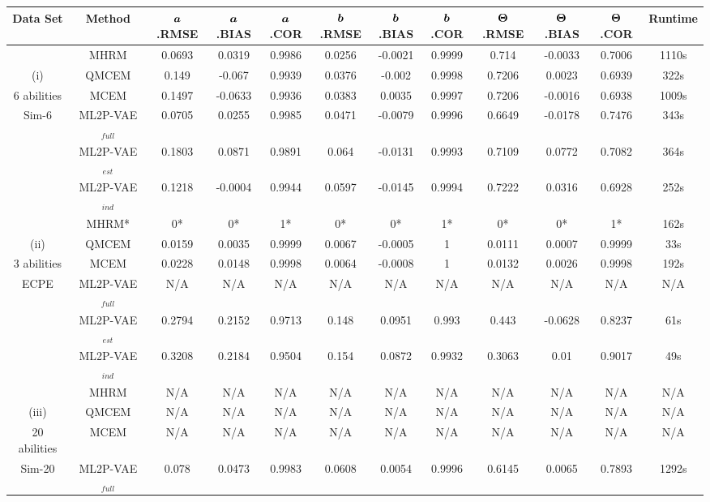 \begin{table}
\footnotesize{
\centering
\begin{tabular}{c|c|ccc|ccc|ccc|c}
  \hline
    Data Set & Method & $\boldsymbol{a}$.RMSE & $\boldsymbol{a}$.BIAS & $\boldsymbol{a}$.COR & $\boldsymbol{b}$.RMSE & $\boldsymbol{b}$.BIAS & $\boldsymbol{b}$.COR &  $\boldsymbol{\Theta}$.RMSE & $\boldsymbol{\Theta}$.BIAS & $\boldsymbol{\Theta}$.COR & Runtime \\
    \hline
& MHRM & 0.0693 & 0.0319  & 0.9986   & 0.0256 & -0.0021 & 0.9999  & 0.714  & -0.0033  & 0.7006 & 1110s \\ 
(i)& QMCEM & 0.149 & -0.067 & 0.9939 & 0.0376 & -0.002 & 0.9998 & 0.7206 & 0.0023 & 0.6939 & 322s\\
6 abilities& MCEM & 0.1497 & -0.0633 &  0.9936 &  0.0383 & 0.0035 & 0.9997 &  0.7206 & -0.0016 & 0.6938 & 1009s\\
Sim-6& ML2P-VAE$_{full}$ & 0.0705 &  0.0255  & 0.9985   & 0.0471 & -0.0079 & 0.9996  & 0.6649   & -0.0178  & 0.7476 & 343s\\
& ML2P-VAE$_{est}$ & 0.1803 & 0.0871  & 0.9891 &  0.064 & -0.0131 & 0.9993  & 0.7109 &  0.0772  & 0.7082 & 364s \\
& ML2P-VAE$_{ind}$ & 0.1218 & -0.0004 & 0.9944   & 0.0597 & -0.0145 & 0.9994  & 0.7222 &  0.0316  & 0.6928 & 252s\\
\hline 
& MHRM* & 0* & 0*&  1* &  0* &  0* &  1* & 0* & 0* &  1* & 162s \\
(ii)& QMCEM & 0.0159  & 0.0035 & 0.9999 & 0.0067  & -0.0005 & 1   & 0.0111 & 0.0007 & 0.9999 & 33s\\
3 abilities & MCEM & 0.0228 & 0.0148 & 0.9998 & 0.0064  & -0.0008 & 1   & 0.0132 & 0.0026 & 0.9998 & 192s \\
ECPE & ML2P-VAE$_{full}$ & N/A & N/A & N/A & N/A & N/A & N/A & N/A & N/A & N/A & N/A  \\
& ML2P-VAE$_{est}$ & 0.2794 & 0.2152 & 0.9713 & 0.148 & 0.0951  & 0.993 & 0.443 & -0.0628 & 0.8237 & 61s  \\
& ML2P-VAE$_{ind}$ & 0.3208 & 0.2184 & 0.9504 & 0.154 & 0.0872  & 0.9932  & 0.3063 & 0.01 & 0.9017 & 49s \\
\hline
& MHRM & N/A & N/A & N/A & N/A & N/A & N/A & N/A & N/A & N/A & N/A  \\
(iii)& QMCEM & N/A & N/A & N/A & N/A & N/A & N/A & N/A & N/A & N/A & N/A \\
20 abilities & MCEM & N/A & N/A & N/A & N/A & N/A & N/A & N/A & N/A & N/A & N/A  \\
Sim-20 & ML2P-VAE$_{full}$ & 0.078 &  0.0473  & 0.9983  & 0.0608 &  0.0054  & 0.9996  & 0.6145 &  0.0065  & 0.7893 & 1292s \\

\end{tabular}}
\end{table}

